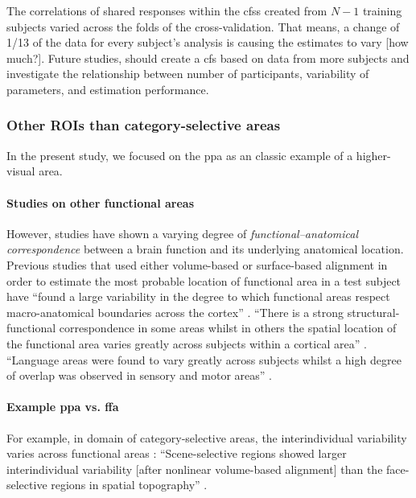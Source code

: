 
The correlations of shared responses within the \acp{cfs} created from $N-1$
training subjects varied across the folds of the cross-validation.
That means, a change of 1/13 of the data for every subject's analysis is causing
the estimates to vary [how much?].
Future studies, should create a \ac{cfs} based on data from more subjects and
investigate the relationship between number of participants, variability of
parameters, and estimation performance.



\subsubsection{Other ROIs than category-selective areas}

%
In the present study, we focused on the \ac{ppa} as an classic example of a
higher-visual area.


\paragraph{Studies on other functional areas}
%
However, studies have shown a varying degree of \textit{functional--anatomical
correspondence} between a brain function and its underlying anatomical location.
%
Previous studies that used either volume-based \citep{zhen2017quantifying,
zhen2015quantifying} or surface-based alignment \citep{rosenke2021probabilistic,
frost2012measuring} in order to estimate the most probable location of
functional area in a test subject have ``found a large variability in the degree
to which functional areas respect macro-anatomical boundaries across the
cortex'' \citep{frost2012measuring}.
%
``There is a strong structural-functional correspondence in some areas whilst in
others the spatial location of the functional area varies greatly across
subjects within a cortical area'' \citep{frost2012measuring}.
%
``Language areas were found to vary greatly across subjects whilst a high degree
of overlap was observed in sensory and motor areas'' \citep{frost2012measuring}.


\paragraph{Example \ac{ppa} vs. \ac{ffa}}
%
For example, in domain of category-selective areas, the interindividual
variability varies across functional areas \citep{zhen2017quantifying,
zhen2015quantifying, frost2012measuring}:
%
``Scene-selective regions showed larger interindividual variability [after
nonlinear volume-based alignment] than the face-selective regions in spatial
topography'' \citep{zhen2017quantifying}.


